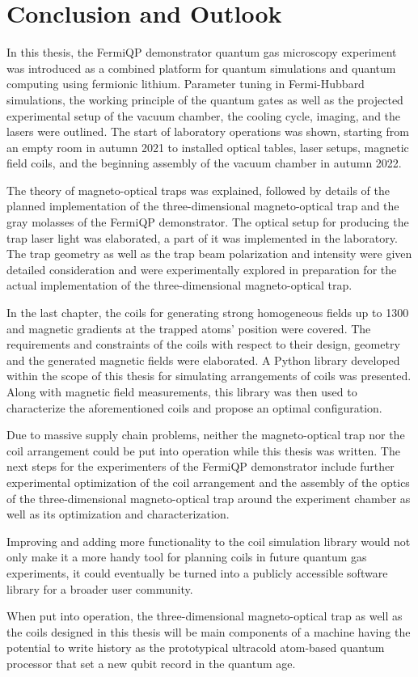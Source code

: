 \renewcommand{\imagepath}{../50-outro/img}

\chapter{Conclusion and Outlook}
In this thesis, the FermiQP demonstrator quantum gas microscopy experiment was introduced as a combined platform for quantum simulations and quantum computing using fermionic lithium. Parameter tuning in Fermi-Hubbard simulations, the working principle of the quantum gates as well as the projected experimental setup of the vacuum chamber, the cooling cycle, imaging, and the lasers were outlined. The start of laboratory operations was shown, starting from an empty room in autumn 2021 to installed optical tables, laser setups, magnetic field coils, and the beginning assembly of the vacuum chamber in autumn 2022.

The theory of magneto-optical traps was explained, followed by details of the planned implementation of the three-dimensional magneto-optical trap and the gray molasses of the FermiQP demonstrator. The optical setup for producing the trap laser light was elaborated, a part of it was implemented in the laboratory. The trap geometry as well as the trap beam polarization and intensity were given detailed consideration and were experimentally explored in preparation for the actual implementation of the three-dimensional magneto-optical trap.

In the last chapter, the coils for generating strong homogeneous fields up to \SI[]{1300}{\gauss} and magnetic gradients at the trapped atoms' position were covered. The requirements and constraints of the coils with respect to their design, geometry and the generated magnetic fields were elaborated. A Python library developed within the scope of this thesis  for simulating arrangements of coils was presented. Along with magnetic field measurements, this library was then used to characterize the aforementioned coils and propose an optimal configuration.

Due to massive supply chain problems, neither the magneto-optical trap nor the coil arrangement could be put into operation while this thesis was written. The next steps for the experimenters of the FermiQP demonstrator include further experimental optimization of the coil arrangement and the assembly of the optics of the three-dimensional magneto-optical trap around the experiment chamber as well as its optimization and  characterization.

Improving and adding more functionality to the coil simulation library would not only make it a more handy tool for planning coils in future quantum gas experiments, it could eventually be turned into a publicly accessible software library for a broader user community.

When put into operation, the three-dimensional magneto-optical trap as well as the coils designed in this thesis will be main components of a machine having the potential to write history as the prototypical ultracold atom-based quantum processor that set a new qubit record in the quantum age.